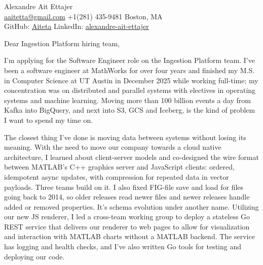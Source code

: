 \documentclass{article}
\begin{document}
\begin{flushleft}
    {\Large Alexandre Ait Ettajer} \\
    \href{mailto:aaitetta@gmail.com}{aaitetta@gmail.com} \quad +1(281) 435-9481 \quad Boston, MA \\
    GitHub: \href{https://github.com/aiteta}{Aiteta} \quad LinkedIn: \href{https://www.linkedin.com/in/alexandre-ait-ettajer-65740b170/}{alexandre-ait-ettajer} \\
\end{flushleft}

\vspace{1em}

Dear Ingestion Platform hiring team,

I'm applying for the Software Engineer role on the Ingestion Platform team. I've been a software engineer at MathWorks for over four years and finished my M.S. in Computer Science at UT Austin in December 2025 while working full-time; my concentration was on distributed and parallel systems with electives in operating systems and machine learning.
Moving more than 100 billion events a day from Kafka into BigQuery, and next into S3, GCS and Iceberg, is the kind of problem I want to spend my time on.

The closest thing I've done is moving data between systems without losing its meaning.
With the need to move our company towards a cloud native architecture, I learned about client-server models and co-designed the wire format between MATLAB's C++ graphics server and JavaScript clients: ordered, idempotent async updates, with compression for repeated data in vector payloads.
Three teams build on it.
I also fixed FIG-file save and load for files going back to 2014, so older releases read newer files and newer releases handle added or removed properties.
It's schema evolution under another name.
Utilizing our new JS renderer, I led a cross-team working group to deploy a stateless Go REST service that delivers our renderer to web pages to allow for visualization and interaction with MATLAB charts without a MATLAB backend.
The service has logging and health checks, and I've also written Go tools for testing and deploying our code.
\end{document}

